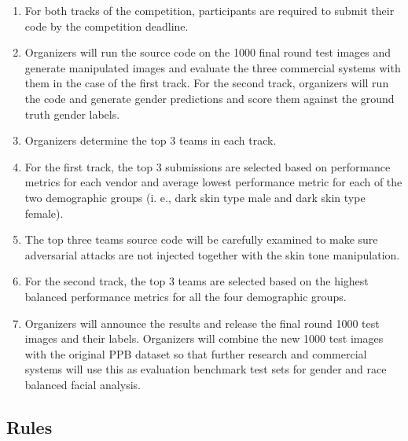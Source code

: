 \documentclass[11pt, oneside]{article}
\begin{document}
\begin{enumerate}
    \item For both tracks of the competition, participants are required to submit their code by the competition deadline.
    \item Organizers will run the source code on the 1000 final round test images and generate manipulated images and evaluate the three commercial systems with them in the case of the first track. For the second track, organizers will run the code and generate gender predictions and score them against the ground truth gender labels.
    \item Organizers determine the top 3 teams in each track. 
    \item For the first track, the top 3 submissions are selected based on performance metrics for each vendor and average lowest performance metric for each of the two demographic groups (i. e., dark skin type male and dark skin type female).
    \item The top three teams source code will be carefully examined to make sure adversarial attacks are not injected together with the skin tone manipulation.
    \item For the second track, the top 3 teams are selected based on the highest balanced performance metrics for all the four demographic groups.
    \item Organizers will announce the results and release the final round 1000 test images and their labels. Organizers will combine the new 1000 test images with the original PPB dataset so that further research and commercial systems will use this as evaluation benchmark test sets for gender and race balanced facial analysis.
\end{enumerate}


\subsection{Rules}
\end{document}
